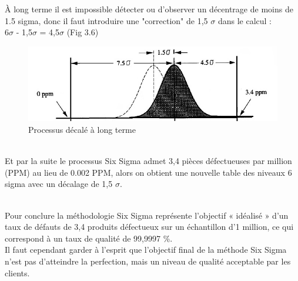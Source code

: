 \documentclass[12pt, a4paper]{thesis}
\begin{document}
À long terme il est impossible détecter ou d’observer un décentrage de moins de 1.5 sigma, donc il faut introduire une "correction" de 1,5 $\sigma$ dans le calcul :\\
6$\sigma$ - 1,5$\sigma$ = 4,5$\sigma$ (Fig 3.6)
\begin{figure}[!h]
\begin{center}
        \includegraphics[scale=0.75]{v1.jpg}
        \caption{Processus décalé à long terme }
\end{center}
\end{figure}
\\Et par la suite le processus Six Sigma admet 3,4 pièces défectueuses par million (PPM) au lieu de 0.002 PPM, alors on obtient une nouvelle table des niveaux 6 sigma avec un décalage de 1,5 $\sigma$.\\
\begin{table}[!htbp]
\begin{center}
\baselineskip 20pt
 \caption{Les niveaux 6 Sigma avec décalage de 1.5 Sigma}
 \end{center}
\end{table}\\
Pour conclure la méthodologie Six Sigma représente l’objectif « idéalisé » d’un taux de défauts de 3,4 produits défectueux sur un échantillon d’1 million, ce qui correspond à un taux de qualité de 99,9997 \%.\\
Il faut cependant garder à l’esprit que l’objectif final de la méthode Six Sigma n’est pas d’atteindre la perfection, mais un niveau de qualité acceptable par les clients.
\end{document}

